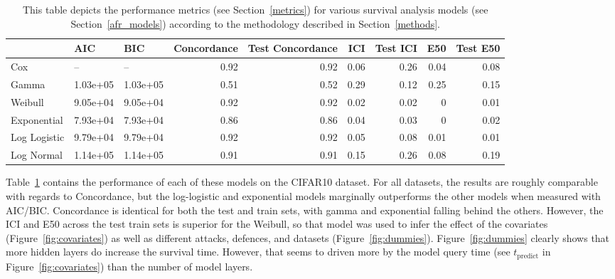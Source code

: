 \begin{table}[b!]
\centering
\begin{tabular}{lllrrrrrr}
\toprule
 & AIC & BIC & Concordance & Test Concordance & ICI & Test ICI & E50 & Test E50 \\
\midrule
Cox & -- & -- & 0.92 & 0.92 & 0.06 & 0.26 & 0.04 & 0.08 \\
Gamma & 1.03e+05 & 1.03e+05 & 0.51 & 0.52 & 0.29 & 0.12 & 0.25 & 0.15 \\
Weibull & 9.05e+04 & 9.05e+04 & 0.92 & 0.92 & 0.02 & 0.02 & 0 & 0.01 \\
Exponential & 7.93e+04 & 7.93e+04 & 0.86 & 0.86 & 0.04 & 0.03 & 0 & 0.02 \\
Log Logistic & 9.79e+04 & 9.79e+04 & 0.92 & 0.92 & 0.05 & 0.08 & 0.01 & 0.01 \\
Log Normal & 1.14e+05 & 1.14e+05 & 0.91 & 0.91 & 0.15 & 0.26 & 0.08 & 0.19 \\
\bottomrule
\end{tabular}
\caption{This table depicts the performance metrics (see Section~\ref{metrics}) for various survival analysis models (see Section~\ref{afr_models}) according to the methodology described in Section~\ref{methods}.}
\label{tab:afr_summary}
\end{table}

Table~\ref{tab:afr_summary} contains the performance of each of these models on the CIFAR10 dataset. For all datasets, the results are roughly comparable with regards to Concordance, but the log-logistic and exponential models marginally outperforms the other models when measured with AIC/BIC\@. Concordance is identical for both the test and train sets, with gamma and exponential falling behind the others. However, the ICI and E50 across the test train sets is superior for the Weibull, so that model was used to infer the effect of the covariates (Figure~\ref{fig:covariates}) as well as different attacks, defences, and datasets (Figure~\ref{fig:dummies}). Figure~\ref{fig:dummies} clearly shows that more hidden layers do increase the survival time. However, that seems to driven more by the model query time (see $t_{\mathrm{predict}}$ in Figure~\ref{fig:covariates}) than the number of model layers.

